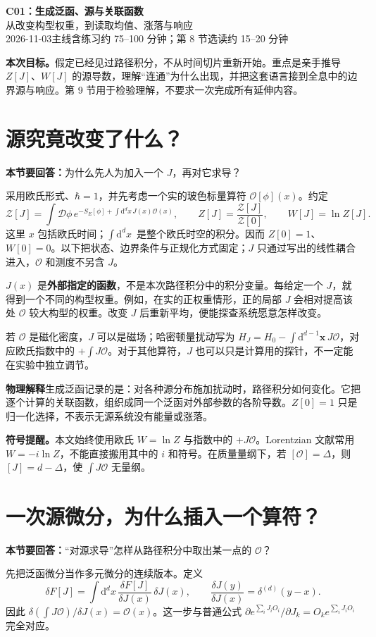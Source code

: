 \documentclass[11pt,a4paper]{article}
\newcommand{\dd}{\mathrm d}
\newcommand{\OO}{\mathcal O}
\newcommand{\ZZ}{\mathcal Z}
\newcommand{\intx}{\int\dd^d x\,}
\newcommand{\physicsnote}[1]{\par\smallskip\noindent\colorbox{pale}{\parbox{\dimexpr\linewidth-2\fboxsep\relax}{\textbf{物理解释}\quad #1}}\par\smallskip}
\newcommand{\question}[1]{\textbf{本节要回答：}#1\par}
\begin{document}
\begin{center}
{\LARGE\bfseries\color{ink}C01：生成泛函、源与关联函数}\\[0.55em]
{\large 从改变构型权重，到读取均值、涨落与响应}\\[0.35em]
{\small 2026-11-03\quad 主线含练习约 75--100 分钟；第 8 节选读约 15--20 分钟}
\end{center}
\textbf{本次目标。}假定已经见过路径积分，不从时间切片重新开始。重点是亲手推导
\(Z[J]\)、\(W[J]\) 的源导数，理解“连通”为什么出现，并把这套语言接到全息中的边界源与响应。第 9 节用于检验理解，不要求一次完成所有延伸内容。

\section{源究竟改变了什么？}
\question{为什么先人为加入一个 \(J\)，再对它求导？}
采用欧氏形式、\(\hbar=1\)，并先考虑一个实的玻色标量算符 \(\OO[\phi](x)\)。约定
\begin{equation}\label{eq:definitions}
 \ZZ[J]=\int\mathcal D\phi\,
 e^{-S_E[\phi]+\intx J(x)\OO(x)},\qquad
 Z[J]=\frac{\ZZ[J]}{\ZZ[0]},\qquad W[J]=\ln Z[J].
\end{equation}
这里 \(x\) 包括欧氏时间；\(\intx\) 是整个欧氏时空的积分。因而 \(Z[0]=1\)、\(W[0]=0\)。以下把状态、边界条件与正规化方式固定；\(J\) 只通过写出的线性耦合进入，\(\OO\) 和测度不另含 \(J\)。

\(J(x)\) 是\textbf{外部指定的函数}，不是本次路径积分中的积分变量。每给定一个 \(J\)，就得到一个不同的构型权重。例如，在实的正权重情形，正的局部 \(J\) 会相对提高该处 \(\OO\) 较大构型的权重。改变 \(J\) 后重新平均，便能探查系统愿意怎样改变。

若 \(\OO\) 是磁化密度，\(J\) 可以是磁场；哈密顿量扰动写为
\(H_J=H_0-\int\dd^{d-1}\mathbf x\,J\OO\)，对应欧氏指数中的 \(+\int J\OO\)。对于其他算符，\(J\) 也可以只是计算用的探针，不一定能在实验中独立调节。

\physicsnote{生成泛函记录的是：对各种源分布施加扰动时，路径积分如何变化。它把逐个计算的关联函数，组织成同一个泛函对外部参数的各阶导数。\(Z[0]=1\) 只是归一化选择，不表示无源系统没有能量或涨落。}
\textbf{符号提醒。}本文始终使用欧氏 \(W=\ln Z\) 与指数中的 \(+J\OO\)。Lorentzian 文献常用 \(W=-i\ln Z\)，不能直接搬用其中的 \(i\) 和符号。在质量量纲下，若 \([\OO]=\Delta\)，则 \([J]=d-\Delta\)，使 \(\int J\OO\) 无量纲。

\newpage
\section{一次源微分，为什么插入一个算符？}
\question{“对源求导”怎样从路径积分中取出某一点的 \(\OO\)？}
先把泛函微分当作多元微分的连续版本。定义
\begin{equation}
 \delta F[J]=\int\dd^d x\,\frac{\delta F[J]}{\delta J(x)}\,\delta J(x),
 \qquad \frac{\delta J(y)}{\delta J(x)}=\delta^{(d)}(y-x).
\end{equation}
因此 \(\delta(\int J\OO)/\delta J(x)=\OO(x)\)。这一步与普通公式
\(\partial e^{\sum_i J_i O_i}/\partial J_k=O_k e^{\sum_iJ_iO_i}\) 完全对应。
\end{document}
